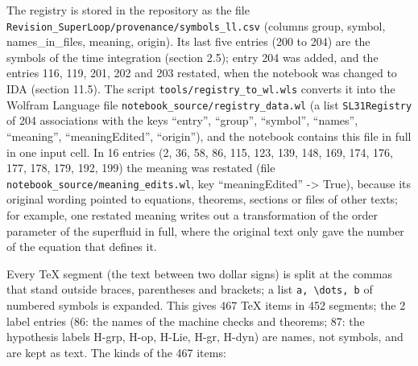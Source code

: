 \documentclass[
  10pt,
]{article}
\begin{document}
The registry is stored in the repository as the file
\texttt{Revision\_SuperLoop/provenance/symbols\_ll.csv} (columns group,
symbol, names\_in\_files, meaning, origin). Its last five entries (200
to 204) are the symbols of the time integration (section 2.5); entry 204
was added, and the entries 116, 119, 201, 202 and 203 restated, when the
notebook was changed to IDA (section 11.5). The script
\texttt{tools/registry\_to\_wl.wls} converts it into the Wolfram
Language file \texttt{notebook\_source/registry\_data.wl} (a list
\texttt{SL31Registry} of 204 associations with the keys ``entry'',
``group'', ``symbol'', ``names'', ``meaning'', ``meaningEdited'',
``origin''), and the notebook contains this file in full in one input
cell. In 16 entries (2, 36, 58, 86, 115, 123, 139, 148, 169, 174, 176,
177, 178, 179, 192, 199) the meaning was restated (file
\texttt{notebook\_source/meaning\_edits.wl}, key ``meaningEdited''
-\textgreater{} True), because its original wording pointed to
equations, theorems, sections or files of other texts; for example, one
restated meaning writes out a transformation of the order parameter of
the superfluid in full, where the original text only gave the number of
the equation that defines it.

Every TeX segment (the text between two dollar signs) is split at the
commas that stand outside braces, parentheses and brackets; a list
\texttt{a,\ \textbackslash{}dots,\ b} of numbered symbols is expanded.
This gives 467 TeX items in 452 segments; the 2 label entries (86: the
names of the machine checks and theorems; 87: the hypothesis labels
H-grp, H-op, H-Lie, H-gr, H-dyn) are names, not symbols, and are kept as
text. The kinds of the 467 items:
\end{document}

